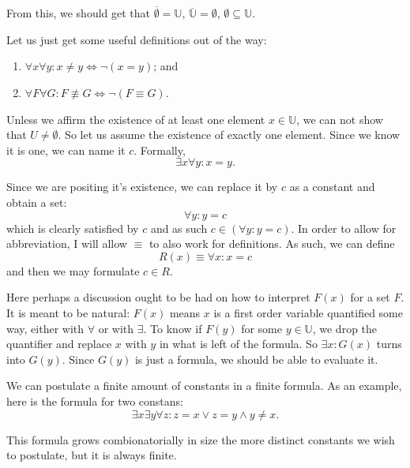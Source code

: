 \documentclass[11pt]{article}
\theoremstyle{plain}
\theoremstyle{nonumberplain}
\newcommand{\wee}{\wedge}
\newcommand{\U}{\mathbb{U}}
\newcommand{\negset}[1]{\overline{#1}}
\newcommand{\nequiv}{\not\equiv}
\begin{document}
From this, we should get that $\negset{\emptyset} = \mathbb{U}$, $\negset{\U} = \emptyset$, $\emptyset \subseteq \U$.

Let us just get some useful definitions out of the way: \begin{enumerate}
    \item $\forall x \forall y : x \neq y \iff \neg (x = y)$; and
    \item $\forall F \forall G : F \nequiv G \iff \neg (F \equiv G)$.
\end{enumerate}

Unless we affirm the existence of at least one element $x \in \U$, we can not show that $U \neq \emptyset$. So let us assume the existence of exactly one element. Since we know it is one, we can name it $c$. Formally, \begin{equation}
    \exists x \forall y : x = y.
\end{equation}

Since we are positing it's existence, we can replace it by $c$ as a constant and obtain a set: \begin{equation}
    \forall y : y = c
\end{equation}
which is clearly satisfied by $c$ and as such $c \in (\forall y : y = c)$. In order to allow for abbreviation, I will allow $\equiv$ to also work for definitions. As such, we can define \begin{equation}
    R(x) \equiv \forall x : x = c
\end{equation}
and then we may formulate $c \in R$.

Here perhaps a discussion ought to be had on how to interpret $F(x)$ for a set $F$. It is meant to be natural: $F(x)$ means $x$ is a first order variable quantified some way, either with $\forall$ or with $\exists$. To know if $F(y)$ for some $y \in \U$, we drop the quantifier and replace $x$ with $y$ in what is left of the formula. So $\exists x : G(x)$ turns into $G(y)$. Since $G(y)$ is just a formula, we should be able to evaluate it.

We can postulate a finite amount of constants in a finite formula. As an example, here is the formula for two constans: \begin{equation}
    \exists x \exists y \forall z : z = x \vee z = y \wee y \neq x.
\end{equation}

This formula grows combionatorially in size the more distinct constants we wish to postulate, but it is always finite.
\end{document}

